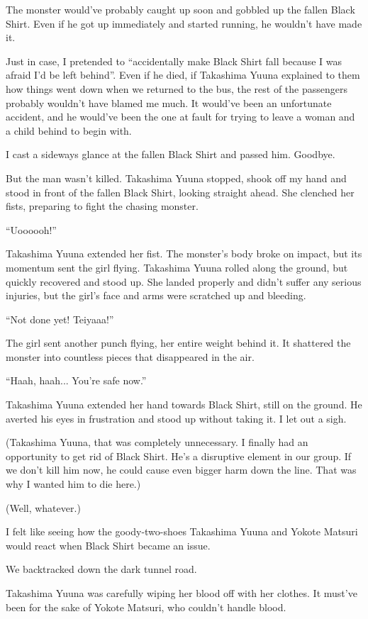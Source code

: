 The monster would've probably caught up soon and gobbled up the fallen Black Shirt. Even if he got up immediately and started running, he wouldn't have made it.

Just in case, I pretended to ``accidentally make Black Shirt fall because I was afraid I'd be left behind''. Even if he died, if Takashima Yuuna explained to them how things went down when we returned to the bus, the rest of the passengers probably wouldn't have blamed me much. It would've been an unfortunate accident, and he would've been the one at fault for trying to leave a woman and a child behind to begin with.

I cast a sideways glance at the fallen Black Shirt and passed him. Goodbye.

But the man wasn't killed. Takashima Yuuna stopped, shook off my hand and stood in front of the fallen Black Shirt, looking straight ahead. She clenched her fists, preparing to fight the chasing monster.

``Uoooooh!''

Takashima Yuuna extended her fist. The monster's body broke on impact, but its momentum sent the girl flying. Takashima Yuuna rolled along the ground, but quickly recovered and stood up. She landed properly and didn't suffer any serious injuries, but the girl's face and arms were scratched up and bleeding.

``Not done yet! Teiyaaa!''

The girl sent another punch flying, her entire weight behind it. It shattered the monster into countless pieces that disappeared in the air.

``Haah, haah... You're safe now.''

Takashima Yuuna extended her hand towards Black Shirt, still on the ground. He averted his eyes in frustration and stood up without taking it. I let out a sigh.

(Takashima Yuuna, that was completely unnecessary. I finally had an opportunity to get rid of Black Shirt. He's a disruptive element in our group. If we don't kill him now, he could cause even bigger harm down the line. That was why I wanted him to die here.)

(Well, whatever.)

I felt like seeing how the goody-two-shoes Takashima Yuuna and Yokote Matsuri would react when Black Shirt became an issue.

We backtracked down the dark tunnel road.

Takashima Yuuna was carefully wiping her blood off with her clothes. It must've been for the sake of Yokote Matsuri, who couldn't handle blood.


